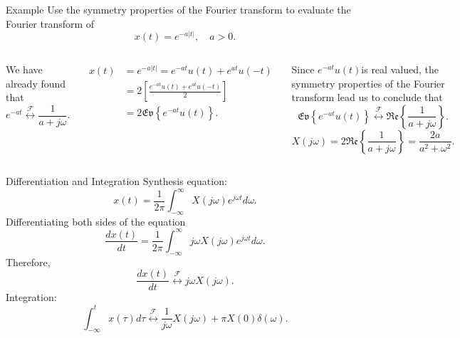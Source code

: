 \begin{frame}{Example}
    Use the symmetry properties of the Fourier transform to evaluate the Fourier transform of
    \begin{equation*}
        x(t) = e^{-a|t|}, \quad a>0.
    \end{equation*}
    \pause
    \begin{columns}
            We have already found that
            \begin{equation*}
                e^{-at} \overset{\mathcal{F}}{\longleftrightarrow} \frac{1}{a+j\omega}.
            \end{equation*}
            
            \begin{align*}
                x(t) &= e^{-a|t|} = e^{-at}u(t) + e^{at}u(-t)\\
                &= 2\left[\frac{e^{-at}u(t) + e^{at}u(-t)}{2}\right]\\
                &= 2\mathfrak{Ev}\left\{ e^{-at}u(t)\right\}.
            \end{align*}
        
            Since $e^{-at}u(t)$is real valued, the symmetry properties of the Fourier transform lead us to conclude that     
            \begin{equation*}
                \mathfrak{Ev}\left\{ e^{-at}u(t)\right\} \overset{\mathcal{F}}{\longleftrightarrow} \mathfrak{Re}\left\{ \frac{1}{a+j\omega}\right\}.
            \end{equation*}
            \pause
            \begin{equation*}
                X(j\omega) = 2\mathfrak{Re}\left\{ \frac{1}{a+j\omega}\right\} = \frac{2a}{a^2 + \omega^2}.
            \end{equation*}
    \end{columns}
\end{frame}


\begin{frame}{Differentiation and Integration}
    Synthesis equation:
    \begin{equation*}
        x(t) = \frac{1}{2\pi}\int_{-\infty}^{\infty}X(j\omega)e^{j\omega t} d\omega.
    \end{equation*}
    Differentiating both  sides of the equation
    \begin{equation*}
        \frac{dx(t)}{dt} = \frac{1}{2\pi}\int_{-\infty}^{\infty}j\omega X(j\omega)e^{j\omega t} d\omega.
    \end{equation*}
    Therefore,
    \begin{equation*}
        \frac{dx(t)}{dt}  \overset{\mathcal{F}}{\longleftrightarrow}  j\omega X(j\omega).
    \end{equation*}
    Integration:
    \begin{equation*}
        \int_{-\infty}^{t} x(\tau)d\tau \overset{\mathcal{F}}{\longleftrightarrow} \frac{1}{ j\omega} X(j\omega) + \pi X(0)\delta(\omega).
    \end{equation*}
\end{frame}


